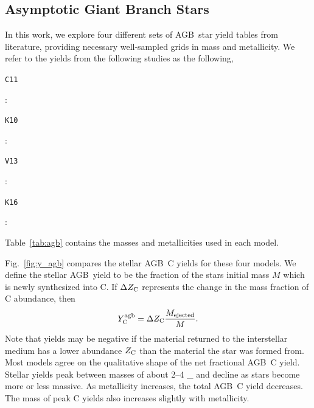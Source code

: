 \documentclass[fleqn,
usenatbib]{mnras}
\newcommand{\agb}{AGB}
\newcommand{\y}{Y}
\newcommand{\Mo}{%
    \ifmmode {\rm M}_{\sun}%
    \else {M$_{\sun}$}%
    \fi}
\begin{document}
\subsection{Asymptotic Giant Branch Stars}\label{sec:agb}



    In this work, we explore four different sets of \agb\ star yield tables from literature,
    providing necessary well-sampled grids in mass and metallicity. We refer to the yields from the following studies as the following,
\begin{description}
    \item \hypertarget{C11}{\texttt{C11}}: \citet{cristallo+11, cristallo+15}
    \item \hypertarget{K10}{\texttt{K10}}: \citet{karakas10}
\item \hypertarget{V13}{\texttt{V13}}: \citet{ventura+13,ventura+14,ventura+18, ventura+20}
    \item \hypertarget{K16}{\texttt{K16}}: \citet{KL16, karakas+18}
\end{description}
Table~\ref{tab:agb} contains the masses and metallicities used in each model.

Fig.~\ref{fig:y_agb} compares the stellar \agb\ C yields for these four models.
We define the stellar \agb\ yield to be the fraction of the stars initial mass $M$ which is newly synthesized into C. If $\Delta Z_{\rm C}$ represents the change in the mass fraction of C abundance, then
\begin{equation}
    \y_{\rm C}^{\rm agb} =  \Delta Z_{\rm C} \frac{M_{\rm ejected}}{M}.
\end{equation}
Note that yields may be negative if the material returned to the interstellar medium has a lower abundance $Z_{\rm C}$ than the material the star was formed from.
Most models agree on the qualitative shape of the net fractional \agb\ C yield.
Stellar yields peak between masses of about 2--4 \Mo and decline as stars become more or less massive. As metallicity increases, the total \agb\ C yield decreases. The mass of peak C yields also increases slightly with metallicity. 
\end{document}
